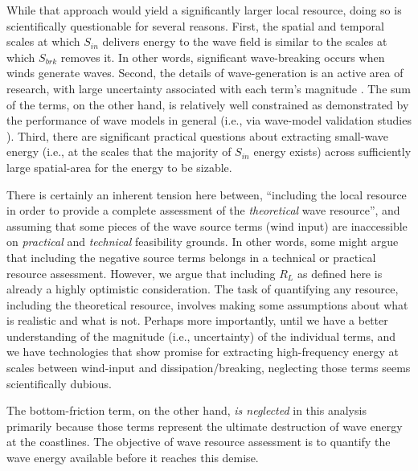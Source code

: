 While that approach would yield a significantly larger local resource, doing so is scientifically questionable for several reasons. First, the spatial and temporal scales at which $S_{in}$ delivers energy to the wave field is similar to the scales at which $S_{brk}$  removes it. In other words, significant wave-breaking  occurs when winds generate waves. Second, the details of wave-generation is an active area of research, with large uncertainty associated with each term's magnitude \citep[e.g.,][]{garcia-medinaWaveResourceAssessment2014}. The sum of the terms, on the other hand, is relatively well constrained as demonstrated by the performance of wave models in general (i.e., via wave-model validation studies ). Third, there are significant practical questions about extracting small-wave energy (i.e., at the scales that the majority of $S_{in}$ energy exists) across sufficiently large spatial-area for the energy to be sizable.

There is certainly an inherent tension here between, ``including the local resource in order to provide a complete assessment of the {\em theoretical} wave resource'', and assuming that some pieces of the wave source terms (wind input) are inaccessible on {\em practical} and {\em technical} feasibility grounds. In other words, some might argue that including the negative source terms belongs in a technical or practical resource assessment. However, we argue that including $R_L$ as defined here is already a highly optimistic consideration.
The task of quantifying any resource, including the theoretical resource, involves making some assumptions about what is realistic and what is not. 
Perhaps more importantly, until we have a better understanding of the magnitude (i.e., uncertainty) of the individual terms, and we have technologies that show promise for extracting high-frequency energy at scales between wind-input and dissipation/breaking, neglecting those terms seems scientifically dubious.

The bottom-friction term, on the other hand, {\em is neglected} in this analysis primarily because those terms represent the ultimate destruction of wave energy at the coastlines. The objective of wave resource assessment is to quantify the wave energy available before it reaches this demise. 

